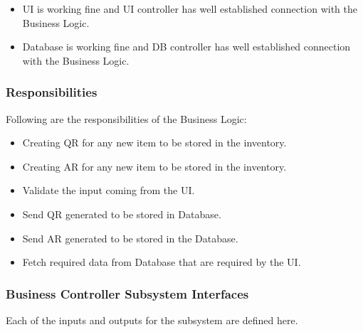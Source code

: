 \begin{itemize}
    
    \item UI is working fine and UI controller has well established connection with the Business Logic.
    \item Database is working fine and DB controller has well established connection with the Business Logic.
\end{itemize}

\subsubsection{Responsibilities}
Following are the responsibilities of the Business Logic:
\begin{itemize}
    \item Creating QR for any new item to be stored in the inventory.
    \item Creating AR for any new item to be stored in the inventory.
    \item Validate the input coming from the UI.
    \item Send QR generated to be stored in Database.
    \item Send AR generated  to be stored in the Database.
    \item Fetch required data from Database that are required by the UI.
\end{itemize}


\subsubsection{Business Controller Subsystem Interfaces}
Each of the inputs and outputs for the subsystem are defined here. 

